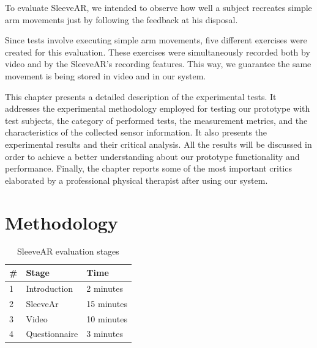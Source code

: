 To evaluate SleeveAR, we intended to observe how well a subject recreates simple arm movements just by following the feedback at his disposal. 

Since tests involve executing simple arm movements, five different exercises were created for this evaluation. These exercises were simultaneously recorded both by video and by the SleeveAR's recording features. This way, we guarantee the same movement is being stored in video and in our system.

This chapter presents a detailed description of the experimental tests. It addresses the experimental methodology employed for testing our prototype with test subjects, the category of performed tests, the measurement metrics, and the characteristics of the collected sensor information. It also presents the experimental results and their critical analysis. All the results will be discussed in order to achieve a better understanding about our prototype functionality and performance.
Finally, the chapter reports some of the most important critics elaborated by a professional physical therapist after using our system.

\section{Methodology} \label{evaluation-methodology}

\begin{table}
\centering
\begin{tabular}{lll}
\hline
\multicolumn{1}{|l|}{\#}& \multicolumn{1}{l|}{Stage}         & \multicolumn{1}{l|}{Time}       \\ \hline
\multicolumn{1}{|l|}{1} & \multicolumn{1}{l|}{Introduction}  & \multicolumn{1}{l|}{2 minutes}  \\ \hline
\multicolumn{1}{|l|}{2} & \multicolumn{1}{l|}{SleeveAr}      & \multicolumn{1}{l|}{15 minutes} \\ \hline
\multicolumn{1}{|l|}{3} & \multicolumn{1}{l|}{Video}         & \multicolumn{1}{l|}{10 minutes} \\ \hline
\multicolumn{1}{|l|}{4} & \multicolumn{1}{l|}{Questionnaire} & \multicolumn{1}{l|}{3 minutes}  \\ \hline
\end{tabular}
\caption{SleeveAR evaluation stages}
\label{table:teststages}
\end{table}


